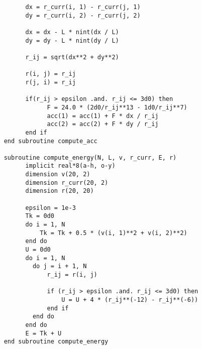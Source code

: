 \begin{verbatim}
          dx = r_curr(i, 1) - r_curr(j, 1)
          dy = r_curr(i, 2) - r_curr(j, 2)

          dx = dx - L * nint(dx / L)
          dy = dy - L * nint(dy / L)

          r_ij = sqrt(dx**2 + dy**2)
          
          r(i, j) = r_ij 
          r(j, i) = r_ij

          if(r_ij > epsilon .and. r_ij <= 3d0) then 
                F = 24.0 * (2d0/r_ij**13 - 1d0/r_ij**7)
                acc(1) = acc(1) + F * dx / r_ij 
                acc(2) = acc(2) + F * dy / r_ij
          end if 
    end subroutine compute_acc

    subroutine compute_energy(N, L, v, r_curr, E, r)
          implicit real*8(a-h, o-y)
          dimension v(20, 2)
          dimension r_curr(20, 2)
          dimension r(20, 20)
          
          epsilon = 1e-3
          Tk = 0d0
          do i = 1, N
              Tk = Tk + 0.5 * (v(i, 1)**2 + v(i, 2)**2)
          end do
          U = 0d0
          do i = 1, N
            do j = i + 1, N
                r_ij = r(i, j)

                if (r_ij > epsilon .and. r_ij <= 3d0) then
                    U = U + 4 * (r_ij**(-12) - r_ij**(-6))
                end if
            end do
          end do
          E = Tk + U
    end subroutine compute_energy
\end{verbatim}